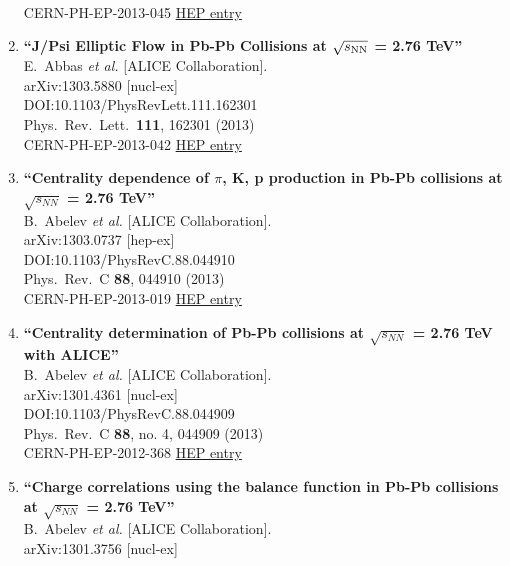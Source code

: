 \begin{enumerate}
  \\{}CERN-PH-EP-2013-045
\href{http://inspirehep.net/record/1225979}{HEP entry}
\item%
{\bf ``J/Psi Elliptic Flow in Pb-Pb Collisions at $\sqrt{s_{\rm NN}}$ = 2.76 TeV''}
  \\{}E.~Abbas {\it et al.} [ALICE Collaboration].
  \\{}arXiv:1303.5880 [nucl-ex]
  \\{}DOI:10.1103/PhysRevLett.111.162301
  \\{}Phys.\ Rev.\ Lett.\  {\bf 111}, 162301 (2013)
  \\{}CERN-PH-EP-2013-042
\href{http://inspirehep.net/record/1225273}{HEP entry}
\item%
{\bf ``Centrality dependence of $\pi$, K, p production in Pb-Pb collisions at $\sqrt{s_{NN}}$ = 2.76 TeV''}
  \\{}B.~Abelev {\it et al.} [ALICE Collaboration].
  \\{}arXiv:1303.0737 [hep-ex]
  \\{}DOI:10.1103/PhysRevC.88.044910
  \\{}Phys.\ Rev.\ C {\bf 88}, 044910 (2013)
  \\{}CERN-PH-EP-2013-019
\href{http://inspirehep.net/record/1222333}{HEP entry}
\item%
{\bf ``Centrality determination of Pb-Pb collisions at $\sqrt{s_{NN}}$ = 2.76 TeV with ALICE''}
  \\{}B.~Abelev {\it et al.} [ALICE Collaboration].
  \\{}arXiv:1301.4361 [nucl-ex]
  \\{}DOI:10.1103/PhysRevC.88.044909
  \\{}Phys.\ Rev.\ C {\bf 88}, no. 4, 044909 (2013)
  \\{}CERN-PH-EP-2012-368
\href{http://inspirehep.net/record/1215085}{HEP entry}
\item%
{\bf ``Charge correlations using the balance function in Pb-Pb collisions at $\sqrt{s_{NN}}$ = 2.76 TeV''}
  \\{}B.~Abelev {\it et al.} [ALICE Collaboration].
  \\{}arXiv:1301.3756 [nucl-ex]

\end{enumerate}

